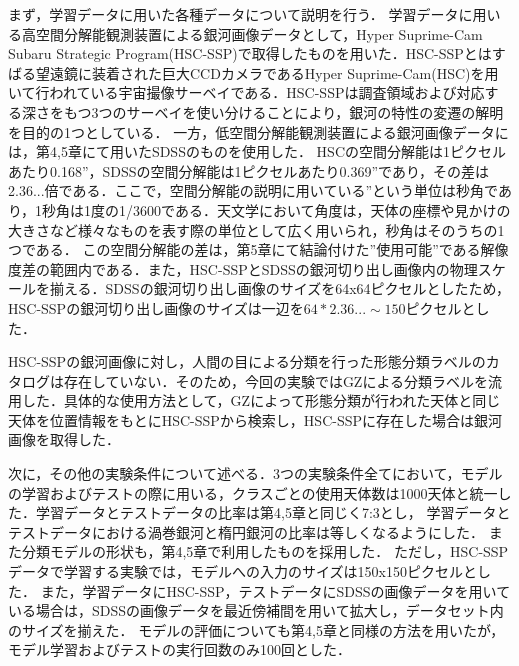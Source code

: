 \documentclass[a4j, 11pt]{jreport}
\begin{document}
まず，学習データに用いた各種データについて説明を行う．
学習データに用いる高空間分解能観測装置による銀河画像データとして，Hyper Suprime-Cam Subaru Strategic Program(HSC-SSP)\cite{Tampo2020}で取得したものを用いた．HSC-SSPとはすばる望遠鏡に装着された巨大CCDカメラであるHyper Suprime-Cam(HSC)を用いて行われている宇宙撮像サーベイである．HSC-SSPは調査領域および対応する深さをもつ3つのサーベイを使い分けることにより，銀河の特性の変遷の解明を目的の1つとしている．
一方，低空間分解能観測装置による銀河画像データには，第4,5章にて用いたSDSSのものを使用した．
HSCの空間分解能は1ピクセルあたり0.168''，SDSSの空間分解能は1ピクセルあたり0.369''であり，その差は2.36...倍である．ここで，空間分解能の説明に用いている''という単位は秒角であり，1秒角は1度の1/3600である．天文学において角度は，天体の座標や見かけの大きさなど様々なものを表す際の単位として広く用いられ，秒角はそのうちの1つである．
この空間分解能の差は，第5章にて結論付けた''使用可能''である解像度差の範囲内である．また，HSC-SSPとSDSSの銀河切り出し画像内の物理スケールを揃える．SDSSの銀河切り出し画像のサイズを64x64ピクセルとしたため，HSC-SSPの銀河切り出し画像のサイズは一辺を$64 * 2.36... \sim 150$ピクセルとした．

HSC-SSPの銀河画像に対し，人間の目による分類を行った形態分類ラベルのカタログは存在していない．そのため，今回の実験ではGZによる分類ラベルを流用した．具体的な使用方法として，GZによって形態分類が行われた天体と同じ天体を位置情報をもとにHSC-SSPから検索し，HSC-SSPに存在した場合は銀河画像を取得した．

次に，その他の実験条件について述べる．3つの実験条件全てにおいて，モデルの学習およびテストの際に用いる，クラスごとの使用天体数は1000天体と統一した．学習データとテストデータの比率は第4,5章と同じく7:3とし，
学習データとテストデータにおける渦巻銀河と楕円銀河の比率は等しくなるようにした．
また分類モデルの形状も，第4,5章で利用したものを採用した．
ただし，HSC-SSPデータで学習する実験では，モデルへの入力のサイズは150x150ピクセルとした．
また，学習データにHSC-SSP，テストデータにSDSSの画像データを用いている場合は，SDSSの画像データを最近傍補間を用いて拡大し，データセット内のサイズを揃えた．
モデルの評価についても第4,5章と同様の方法を用いたが，モデル学習およびテストの実行回数のみ100回とした．
\end{document}
